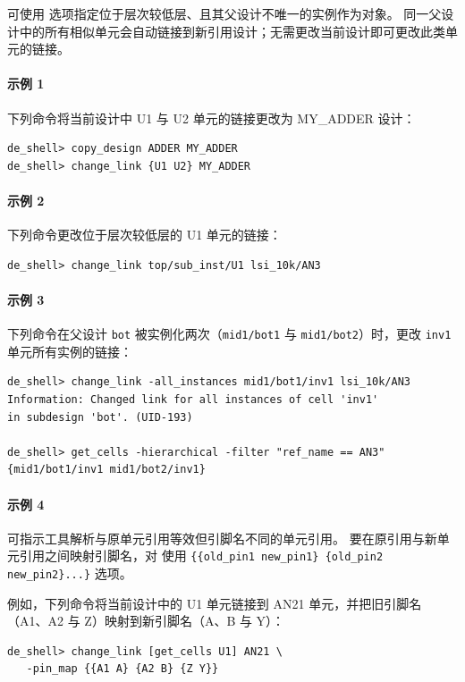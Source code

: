 可使用  选项指定位于层次较低层、且其父设计不唯一的实例作为对象。
同一父设计中的所有相似单元会自动链接到新引用设计；无需更改当前设计即可更改此类单元的链接。

\paragraph{示例 1}
下列命令将当前设计中 U1 与 U2 单元的链接更改为 MY\_ADDER 设计：
\begin{lstlisting}
de_shell> copy_design ADDER MY_ADDER
de_shell> change_link {U1 U2} MY_ADDER
\end{lstlisting}

\paragraph{示例 2}
下列命令更改位于层次较低层的 U1 单元的链接：
\begin{lstlisting}
de_shell> change_link top/sub_inst/U1 lsi_10k/AN3
\end{lstlisting}

\paragraph{示例 3}
下列命令在父设计 \texttt{bot} 被实例化两次（\texttt{mid1/bot1} 与 \texttt{mid1/bot2}）时，更改 \texttt{inv1} 单元所有实例的链接：
\begin{lstlisting}
de_shell> change_link -all_instances mid1/bot1/inv1 lsi_10k/AN3
Information: Changed link for all instances of cell 'inv1'
in subdesign 'bot'. (UID-193)

de_shell> get_cells -hierarchical -filter "ref_name == AN3"
{mid1/bot1/inv1 mid1/bot2/inv1}
\end{lstlisting}

\paragraph{示例 4}
可指示工具解析与原单元引用等效但引脚名不同的单元引用。
要在原引用与新单元引用之间映射引脚名，对  使用
 \texttt{\{\{old\_pin1 new\_pin1\} \{old\_pin2 new\_pin2\}...\}} 选项。

例如，下列命令将当前设计中的 U1 单元链接到 AN21 单元，并把旧引脚名（A1、A2 与 Z）映射到新引脚名（A、B 与 Y）：
\begin{lstlisting}
de_shell> change_link [get_cells U1] AN21 \
   -pin_map {{A1 A} {A2 B} {Z Y}}
\end{lstlisting}

